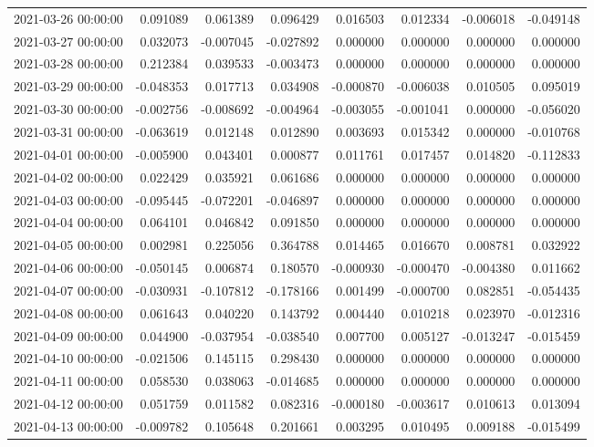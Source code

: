 \begin{tabular}{lrrrrrrr}
2021-03-26 00:00:00 & 0.091089 & 0.061389 & 0.096429 & 0.016503 & 0.012334 & -0.006018 & -0.049148 \\
2021-03-27 00:00:00 & 0.032073 & -0.007045 & -0.027892 & 0.000000 & 0.000000 & 0.000000 & 0.000000 \\
2021-03-28 00:00:00 & 0.212384 & 0.039533 & -0.003473 & 0.000000 & 0.000000 & 0.000000 & 0.000000 \\
2021-03-29 00:00:00 & -0.048353 & 0.017713 & 0.034908 & -0.000870 & -0.006038 & 0.010505 & 0.095019 \\
2021-03-30 00:00:00 & -0.002756 & -0.008692 & -0.004964 & -0.003055 & -0.001041 & 0.000000 & -0.056020 \\
2021-03-31 00:00:00 & -0.063619 & 0.012148 & 0.012890 & 0.003693 & 0.015342 & 0.000000 & -0.010768 \\
2021-04-01 00:00:00 & -0.005900 & 0.043401 & 0.000877 & 0.011761 & 0.017457 & 0.014820 & -0.112833 \\
2021-04-02 00:00:00 & 0.022429 & 0.035921 & 0.061686 & 0.000000 & 0.000000 & 0.000000 & 0.000000 \\
2021-04-03 00:00:00 & -0.095445 & -0.072201 & -0.046897 & 0.000000 & 0.000000 & 0.000000 & 0.000000 \\
2021-04-04 00:00:00 & 0.064101 & 0.046842 & 0.091850 & 0.000000 & 0.000000 & 0.000000 & 0.000000 \\
2021-04-05 00:00:00 & 0.002981 & 0.225056 & 0.364788 & 0.014465 & 0.016670 & 0.008781 & 0.032922 \\
2021-04-06 00:00:00 & -0.050145 & 0.006874 & 0.180570 & -0.000930 & -0.000470 & -0.004380 & 0.011662 \\
2021-04-07 00:00:00 & -0.030931 & -0.107812 & -0.178166 & 0.001499 & -0.000700 & 0.082851 & -0.054435 \\
2021-04-08 00:00:00 & 0.061643 & 0.040220 & 0.143792 & 0.004440 & 0.010218 & 0.023970 & -0.012316 \\
2021-04-09 00:00:00 & 0.044900 & -0.037954 & -0.038540 & 0.007700 & 0.005127 & -0.013247 & -0.015459 \\
2021-04-10 00:00:00 & -0.021506 & 0.145115 & 0.298430 & 0.000000 & 0.000000 & 0.000000 & 0.000000 \\
2021-04-11 00:00:00 & 0.058530 & 0.038063 & -0.014685 & 0.000000 & 0.000000 & 0.000000 & 0.000000 \\
2021-04-12 00:00:00 & 0.051759 & 0.011582 & 0.082316 & -0.000180 & -0.003617 & 0.010613 & 0.013094 \\
2021-04-13 00:00:00 & -0.009782 & 0.105648 & 0.201661 & 0.003295 & 0.010495 & 0.009188 & -0.015499 \\

\end{tabular}
